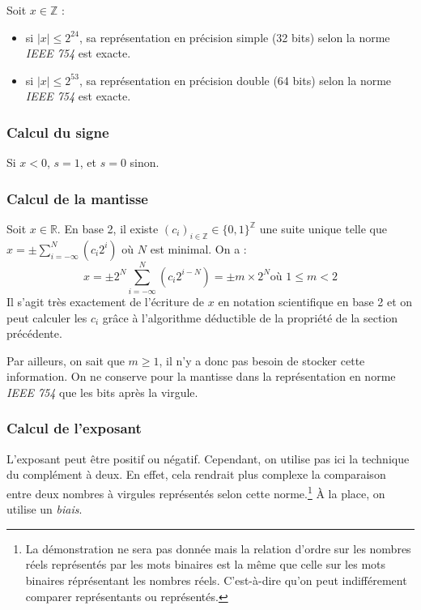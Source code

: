\documentclass[../../main.tex]{subfiles}
\begin{document}
 Soit $x\in\mathbb{Z}$ : 
\begin{itemize}
  \item si $|x| \leq 2^{24}$, sa représentation en précision simple (32 bits) selon la norme \textit{IEEE 754} est exacte.
  \item si $|x| \leq 2^{53}$, sa représentation en précision double (64 bits) selon la norme \textit{IEEE 754} est exacte.
\end{itemize}
\subsubsection{Calcul du signe} \label{ssub:calcul_du_signe}
Si $x < 0$, $s = 1$, et $s= 0$ sinon.
\subsubsection{Calcul de la mantisse} \label{ssub:calcul_de_la_mantisse}
Soit $x\in{\mathbb{R}}$.\newline
En base 2, il existe $(c_{i})_{i\in{\mathbb{Z}}}\in{\{0, 1\}^{\mathbb{Z}}}$ une suite unique telle que $x = \pm \displaystyle\sum_{i = -\infty}^{N}\left(c_{i}2^{i}\right)$ où $N$ est minimal.\newline
On a :
$$x = \pm 2^{N}\displaystyle\sum_{i = -\infty}^{N}\left(c_{i}2^{i-N}\right) = \pm m\times{2^{N}}\text{où $1 \leq m < 2$}$$
Il s'agit très exactement de l'écriture de $x$ en notation scientifique en base 2 et on peut calculer les $c_{i}$ grâce à l'algorithme déductible de la propriété de la section précédente.

Par ailleurs, on sait que $m\geq{1}$, il n'y a donc pas besoin de stocker cette information. On ne conserve pour la mantisse dans la représentation en norme \textit{IEEE 754} que les bits après la virgule.

\subsubsection{Calcul de l'exposant} \label{ssub:calcul_de_l_exposant}
L'exposant peut être positif ou négatif. Cependant, on utilise pas ici la technique du complément à deux. En effet, cela rendrait plus complexe la comparaison entre deux nombres à virgules représentés selon cette norme.\footnote{La démonstration ne sera pas donnée mais la relation d'ordre sur les nombres réels représentés par les mots binaires est la même que celle sur les mots binaires réprésentant les nombres réels. C'est-à-dire qu'on peut indifférement comparer représentants ou représentés.} À la place, on utilise un \textit{biais}.
\end{document}
